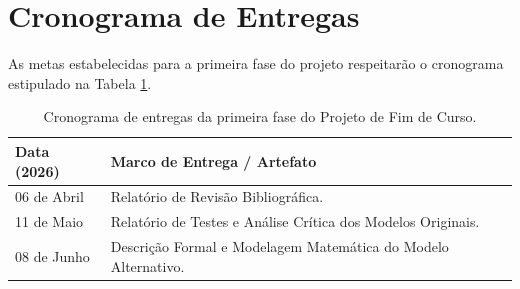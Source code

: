 \documentclass[12pt, a4paper]{article}
\begin{document}
\section{Cronograma de Entregas}
As metas estabelecidas para a primeira fase do projeto respeitarão o cronograma estipulado na Tabela \ref{tab:cronograma}.

\begin{table}[h!]
\centering
\caption{Cronograma de entregas da primeira fase do Projeto de Fim de Curso.}
\vspace{0.2cm}
\label{tab:cronograma}
\begin{tabular}{@{}ll@{}}
\toprule
\textbf{Data (2026)} & \textbf{Marco de Entrega / Artefato} \\ \midrule
06 de Abril & Relatório de Revisão Bibliográfica. \\
11 de Maio  & Relatório de Testes e Análise Crítica dos Modelos Originais. \\
08 de Junho & Descrição Formal e Modelagem Matemática do Modelo Alternativo. \\ \bottomrule
\end{tabular}
\end{table}
\end{document}
